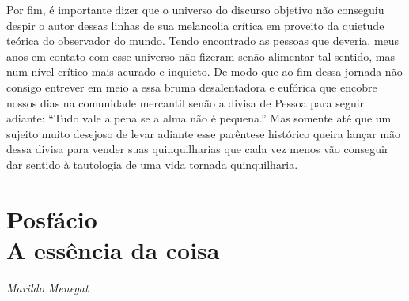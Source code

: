 Por fim, é importante dizer que o universo do discurso objetivo não
conseguiu despir o autor dessas linhas de sua melancolia crítica em
proveito da quietude teórica do observador do mundo. Tendo encontrado as
pessoas que deveria, meus anos em contato com esse universo não fizeram
senão alimentar tal sentido, mas num nível crítico mais acurado e
inquieto. De modo que ao fim dessa jornada não consigo entrever em meio
a essa bruma desalentadora e eufórica que encobre nossos dias na
comunidade mercantil senão a divisa de Pessoa para seguir adiante:
``Tudo vale a pena se a alma não é pequena.'' Mas somente até que um
sujeito muito desejoso de levar adiante esse parêntese histórico queira
lançar mão dessa divisa para vender suas quinquilharias que cada vez
menos vão conseguir dar sentido à tautologia de uma vida tornada
quinquilharia.

\chapter*{Posfácio\\A essência da coisa}

\begin{flushright}
\emph{Marildo Menegat}
\end{flushright}

